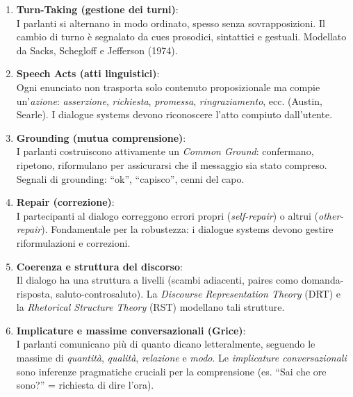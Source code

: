 \documentclass[12pt,a4paper]{article}
\begin{document}
\begin{enumerate}[leftmargin=1.5em, label=\textbf{\arabic*.}]
  \item \textbf{Turn-Taking (gestione dei turni)}: \\
    I parlanti si alternano in modo ordinato, spesso senza sovrapposizioni. Il cambio di turno è segnalato da cues prosodici, sintattici e gestuali. Modellato da Sacks, Schegloff e Jefferson (1974).

  \item \textbf{Speech Acts (atti linguistici)}: \\
    Ogni enunciato non trasporta solo contenuto proposizionale ma compie un'\emph{azione}: \emph{asserzione}, \emph{richiesta}, \emph{promessa}, \emph{ringraziamento}, ecc. (Austin, Searle). I dialogue systems devono riconoscere l'atto compiuto dall'utente.

  \item \textbf{Grounding (mutua comprensione)}: \\
    I parlanti costruiscono attivamente un \emph{Common Ground}: confermano, ripetono, riformulano per assicurarsi che il messaggio sia stato compreso. Segnali di grounding: ``ok'', ``capisco'', cenni del capo.

  \item \textbf{Repair (correzione)}: \\
    I partecipanti al dialogo correggono errori propri (\emph{self-repair}) o altrui (\emph{other-repair}). Fondamentale per la robustezza: i dialogue systems devono gestire riformulazioni e correzioni.

  \item \textbf{Coerenza e struttura del discorso}: \\
    Il dialogo ha una struttura a livelli (scambi adiacenti, paires como domanda-risposta, saluto-controsaluto). La \emph{Discourse Representation Theory} (DRT) e la \emph{Rhetorical Structure Theory} (RST) modellano tali strutture.

  \item \textbf{Implicature e massime conversazionali (Grice)}: \\
    I parlanti comunicano più di quanto dicano letteralmente, seguendo le massime di \emph{quantità}, \emph{qualità}, \emph{relazione} e \emph{modo}. Le \emph{implicature conversazionali} sono inferenze pragmatiche cruciali per la comprensione (es. ``Sai che ore sono?'' = richiesta di dire l'ora).
\end{enumerate}
\end{document}
